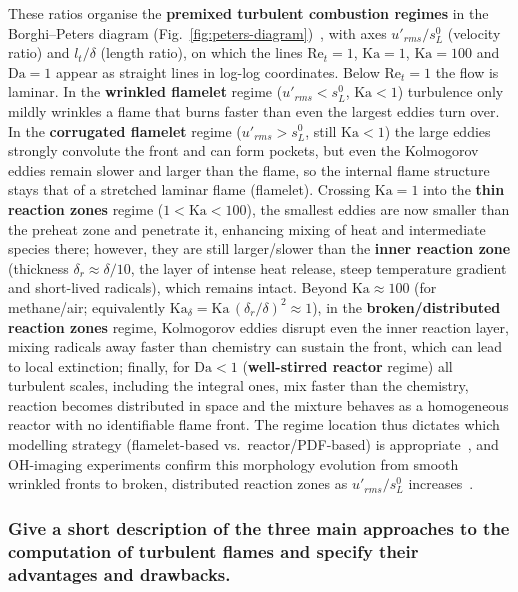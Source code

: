 {These ratios organise the \textbf{premixed turbulent combustion regimes} in the Borghi--Peters diagram (Fig.~\ref{fig:peters-diagram})~\cite{peters2000turbulent,warnatz2006combustion,roekaerts2010jmbc}, with axes $u'_{rms}/s_L^0$ (velocity ratio) and $l_t/\delta$ (length ratio), on which the lines $\mathrm{Re}_t = 1$, $\mathrm{Ka} = 1$, $\mathrm{Ka} = 100$ and $\mathrm{Da} = 1$ appear as straight lines in log-log coordinates. Below $\mathrm{Re}_t = 1$ the flow is laminar. In the \textbf{wrinkled flamelet} regime ($u'_{rms} < s_L^0$, $\mathrm{Ka} < 1$) turbulence only mildly wrinkles a flame that burns faster than even the largest eddies turn over. In the \textbf{corrugated flamelet} regime ($u'_{rms} > s_L^0$, still $\mathrm{Ka} < 1$) the large eddies strongly convolute the front and can form pockets, but even the Kolmogorov eddies remain slower and larger than the flame, so the internal flame structure stays that of a stretched laminar flame (flamelet). Crossing $\mathrm{Ka} = 1$ into the \textbf{thin reaction zones} regime ($1 < \mathrm{Ka} < 100$), the smallest eddies are now smaller than the preheat zone and penetrate it, enhancing mixing of heat and intermediate species there; however, they are still larger/slower than the \textbf{inner reaction zone} (thickness $\delta_r \approx \delta/10$, the layer of intense heat release, steep temperature gradient and short-lived radicals), which remains intact. Beyond $\mathrm{Ka} \approx 100$ (for methane/air; equivalently $\mathrm{Ka}_\delta = \mathrm{Ka}\,(\delta_r/\delta)^2 \approx 1$), in the \textbf{broken/distributed reaction zones} regime, Kolmogorov eddies disrupt even the inner reaction layer, mixing radicals away faster than chemistry can sustain the front, which can lead to local extinction; finally, for $\mathrm{Da} < 1$ (\textbf{well-stirred reactor} regime) all turbulent scales, including the integral ones, mix faster than the chemistry, reaction becomes distributed in space and the mixture behaves as a homogeneous reactor with no identifiable flame front. The regime location thus dictates which modelling strategy (flamelet-based vs.\ reactor/PDF-based) is appropriate~\cite{veynante2002turbulent}, and OH-imaging experiments confirm this morphology evolution from smooth wrinkled fronts to broken, distributed reaction zones as $u'_{rms}/s_L^0$ increases~\cite{ciccarelli2008flame}.
}

\subsubsection{Give a short description of the three main approaches to the computation of turbulent flames and specify their advantages and drawbacks.}

